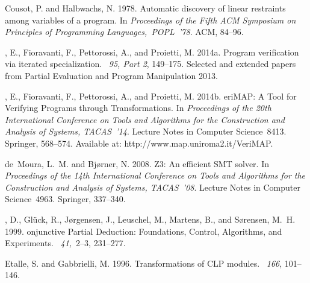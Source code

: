 \documentclass[english]{tlp}
\begin{document}
\begin{thebibliography}{}
{\sc Cousot, P.} {\sc and} {\sc Halbwachs, N.} 1978.
\newblock Automatic discovery of linear restraints among variables of a
  program.
\newblock In {\em Proceedings of the Fifth ACM Symposium on Principles of
  Programming Languages,~POPL~'78}. {ACM}, 84--96.

{, E.}, {\sc Fioravanti, F.}, {\sc Pettorossi, A.}, {\sc and}
  {\sc Proietti, M.} 2014a.
\newblock Program verification via iterated specialization.
~{\em 95, Part 2}, 149--175.
\newblock Selected and extended papers from Partial Evaluation and Program
  Manipulation 2013.

{, E.}, {\sc Fioravanti, F.}, {\sc Pettorossi, A.}, {\sc and}
  {\sc Proietti, M.} 2014b.
eri{MAP}: {A} {T}ool for {V}erifying {P}rograms through
  {T}ransformations.
\newblock In {\em Proceedings of the 20th International Conference on Tools and
  Algorithms for the Construction and Analysis of Systems, TACAS~'14}. Lecture
  Notes in Computer Science~8413. Springer, 568--574.
\newblock Available at: {\rm http://www.map.uniroma2.it/VeriMAP}.

{\sc de~Moura, L.~M.} {\sc and} {\sc Bj{\o}rner, N.} 2008.
\newblock Z3: {A}n efficient {SMT} solver.
\newblock In {\em Proceedings of the 14th International Conference on Tools and
  Algorithms for the Construction and Analysis of Systems, {TACAS}~'08}.
  Lecture Notes in Computer Science~4963. Springer, 337--340.

{, D.}, {\sc Gl{\"u}ck, R.}, {\sc J{\o}rgensen, J.}, {\sc
  Leuschel, M.}, {\sc Martens, B.}, {\sc and} {\sc S{\o}rensen, M.~H.} 1999.
onjunctive {P}artial {D}eduction: {F}oundations, {C}ontrol,
  {A}lgorithms, and {E}xperiments.
~{\em 41,\/}~2--3, 231--277.

{\sc Etalle, S.} {\sc and} {\sc Gabbrielli, M.} 1996.
\newblock Trans\-form\-ations of {CLP} modules.
~{\em 166}, 101--146.


\end{thebibliography}
\end{document}
